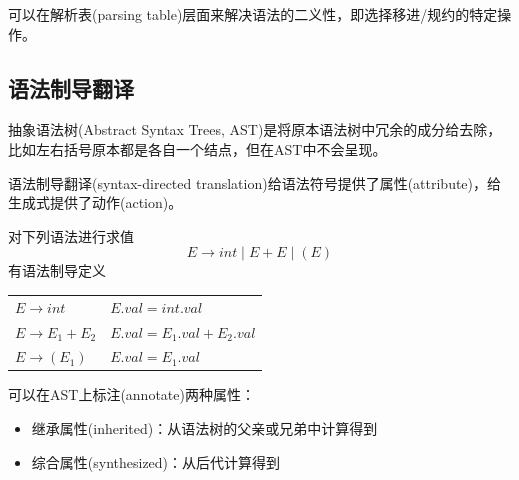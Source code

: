 可以在解析表(parsing table)层面来解决语法的二义性，即选择移进/规约的特定操作。

\subsection{语法制导翻译}
抽象语法树(Abstract Syntax Trees, AST)是将原本语法树中冗余的成分给去除，比如左右括号原本都是各自一个结点，但在AST中不会呈现。

语法制导翻译(syntax-directed translation)给语法符号提供了属性(attribute)，给生成式提供了动作(action)。
\begin{example}
对下列语法进行求值
\[E\to int\mid E+E\mid (E)\]
有语法制导定义
\begin{center}
\begin{tabular}{ll}
$E\to int$ & $E.val=int.val$\\
$E\to E_1+E_2$ & $E.val=E_1.val+E_2.val$\\
$E\to (E_1)$ & $E.val=E_1.val$
\end{tabular}
\end{center}
\end{example}

可以在AST上标注(annotate)两种属性：
\begin{itemize}
\item 继承属性(inherited)：从语法树的父亲或兄弟中计算得到
\item 综合属性(synthesized)：从后代计算得到
\end{itemize}


